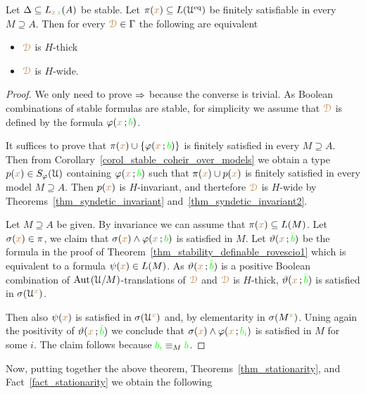\begin{theorem}\label{thm_thick_finsat}
  Let $\Delta\subseteq L_{{\color{brown} x}\,{\color{green} z}}(A)$ be stable.
  Let $\pi({\color{brown} x})\subseteq L(\EuScript U^{{\rm eq}})$ be finitely satisfiable in every $M\supseteq A$.
  Then for every ${\color{brown}\EuScript D}\in\Gamma$ the following are equivalent 
  \begin{itemize}
    \item[1.] ${\color{brown}\EuScript D}$ is $H$-thick
    \item[2.] ${\color{brown}\EuScript D}$ is $H$-wide.
  \end{itemize}\smallskip
\end{theorem}
\begin{proof}
  We only need to prove $\Rightarrow$ because the converse is trivial.
  As Boolean combinations of stable formulas are stable, for simplicity we assume that ${\color{brown}\EuScript D}$ is defined by the formula $\varphi({\color{brown} x}\,;{\color{green} b})$.

  It suffices to prove that $\pi({\color{brown} x})\cup\{\varphi({\color{brown} x}\,;{\color{green} b})\}$ is finitely satisfied in every $M\supseteq A$.
  Then from Corollary~\ref{corol_stable_coheir_over_models} we obtain a type $p({\color{brown} x})\in S_\varphi(\EuScript U)$ containing $\varphi({\color{brown} x}\,;{\color{green} b})$ such that $\pi({\color{brown} x})\cup p({\color{brown} x})$ is finitely  satisfied in every model $M\supseteq A$. 
  Then $p({\color{brown} x})$ is $H$-invariant, and thertefore ${\color{brown}\EuScript D}$ is $H$-wide by Theorems~\ref{thm_syndetic_invariant} and~\ref{thm_syndetic_invariant2}.
  
  Let $M\supseteq A$ be given.
  By invariance we can assume that $\pi({\color{brown} x})\subseteq L(M)$.
  Let $\sigma({\color{brown} x})\in\pi$, we claim that $\sigma({\color{brown} x})\wedge\varphi({\color{brown} x}\,;{\color{green} b})$ is satisfied in $M$.
  Let $\vartheta({\color{brown} x}\,;{\color{green}\bar b})$ be the formula in the proof of Theorem~\ref{thm_stability_definable_rovescio1} which is equivalent to a formula $\psi({\color{brown} x})\in L(M)$.
  As $\vartheta({\color{brown} x}\,;{\color{green}\bar b})$ is a positive Boolean combination of ${\rm Aut\kern.15ex}(\EuScript U/M)$-translations of ${\color{brown}\EuScript D}$ and ${\color{brown}\EuScript D}$ is $H$-thick, $\vartheta({\color{brown} x}\,;{\color{green}\bar b})$ is satisfied in $\sigma(\EuScript U^{\color{brown} x})$.

  Then also $\psi({\color{brown} x})$ is satisfied in $\sigma(\EuScript U^{\color{brown} x})$ and, by elementarity in $\sigma(M^{\color{brown} x})$.
  Uning again the positivity of $\vartheta({\color{brown} x}\,;{\color{green}\bar b})$ we conclude that $\sigma({\color{brown} x})\wedge\varphi({\color{brown} x}\,;{\color{green} b_i})$ is satisfied in $M$ for some $i$.
  The claim follows because ${\color{green} b_i}\equiv_M{\color{green} b}$.
\end{proof}

Now, putting together the above theorem, Theorems~\ref{thm_stationarity}, and Fact~\ref{fact_stationarity} we obtain the following 

